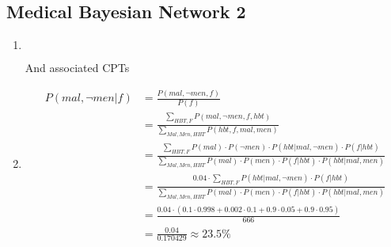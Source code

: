 \documentclass[fleqn,12pt]{scrartcl}
\begin{document}
 \subsection{Medical Bayesian Network 2}
 \begin{enumerate}
	 \item$\quad$

 And associated CPTs
 \item
	 \begin{align*}
		 P(mal, \neg men | f) &= \frac{P(mal, \neg men, f)}{P(f)}\\
													&= \frac{\sum_{HBT, F} P(mal, \neg men, f, hbt)}{\sum_{Mal, Men, HBT} P(hbt, f, mal, men)}\\
							 &= \frac{\sum_{HBT, F} P(mal) \cdot P(\neg men) \cdot P(hbt | mal, \neg men) \cdot P(f | hbt)}{\sum_{Mal, Men, HBT} P(mal) \cdot P(men) \cdot P(f | hbt) \cdot P(hbt | mal, men)}\\
							 &= \frac{0.04 \cdot\sum_{HBT, F}  P(hbt | mal, \neg men) \cdot P(f | hbt)}{\sum_{Mal, Men, HBT} P(mal) \cdot P(men) \cdot P(f | hbt) \cdot P(hbt | mal, men)}\\
					&= \frac{0.04 \cdot (0.1 \cdot 0.998 + 0.002 \cdot 0.1 + 0.9 \cdot 0.05 + 0.9 \cdot 0.95)}{666}\\
				 &= \frac{0.04}{0.170429} \approx 23.5\%
	 \end{align*}
 \end{enumerate}



 
\end{document}
